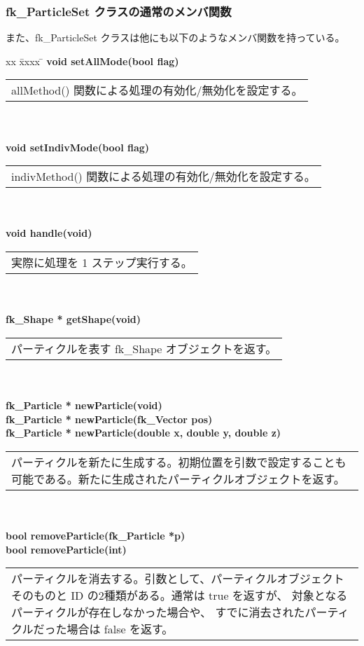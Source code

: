 \subsubsection{fk\_ParticleSet クラスの通常のメンバ関数}
また、fk\_ParticleSet クラスは他にも以下のようなメンバ関数を持っている。
\begin{tabbing}
xx \= xxxx \= \kill
\> \textbf{void setAllMode(bool flag)} \\
	\> \> \begin{tabular}{p{15cm}}
		allMethod() 関数による処理の有効化/無効化を設定する。
	\end{tabular} \\ \\

\> \textbf{void setIndivMode(bool flag)} \\
	\> \> \begin{tabular}{p{15cm}}
		indivMethod() 関数による処理の有効化/無効化を設定する。
	\end{tabular} \\ \\

\> \textbf{void handle(void)} \\
	\> \> \begin{tabular}{p{15cm}}
		実際に処理を 1 ステップ実行する。
	\end{tabular} \\ \\

\> \textbf{fk\_Shape * getShape(void)} \\
	\> \> \begin{tabular}{p{15cm}}
		パーティクルを表す fk\_Shape オブジェクトを返す。
	\end{tabular} \\ \\

\> \textbf{fk\_Particle * newParticle(void)} \\
\> \textbf{fk\_Particle * newParticle(fk\_Vector pos)} \\
\> \textbf{fk\_Particle * newParticle(double x, double y, double z)} \\
	\> \> \begin{tabular}{p{15cm}}
		パーティクルを新たに生成する。初期位置を引数で設定することも
		可能である。新たに生成されたパーティクルオブジェクトを返す。
	\end{tabular} \\ \\

\> \textbf{bool removeParticle(fk\_Particle *p)} \\
\> \textbf{bool removeParticle(int)} \\
	\> \> \begin{tabular}{p{15cm}}
		パーティクルを消去する。引数として、パーティクルオブジェクト
		そのものと ID の2種類がある。通常は true を返すが、
		対象となるパーティクルが存在しなかった場合や、
		すでに消去されたパーティクルだった場合は false を返す。
	\end{tabular} \\ \\


\end{tabbing}
